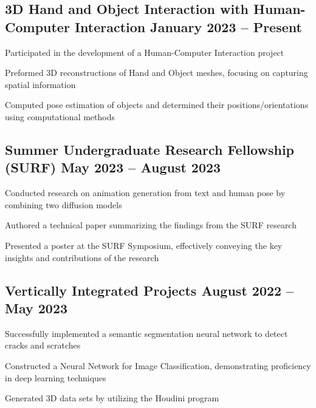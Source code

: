 \documentclass[letter,10pt]{article}
\begin{document}
\subsection{{3D Hand and Object Interaction with Human-Computer Interaction \hfill January 2023 – Present}}
\begin{zitemize}
\item Participated in the development of a Human-Computer Interaction project
\item Preformed 3D reconstructions of Hand and Object meshes, focusing on capturing spatial information
\item Computed pose estimation of objects and determined their positions/orientations using computational methods


\end{zitemize}

\subsection{{Summer Undergraduate Research Fellowship (SURF) \hfill May 2023 – August 2023}}
\begin{zitemize}
\item Conducted research on animation generation from text and human pose by combining two diffusion models
\item Authored a technical paper summarizing the findings from the SURF research
\item Presented a poster at the SURF Symposium, effectively conveying the key insights and contributions of the research
\end{zitemize}


\subsection{{Vertically Integrated Projects \hfill August 2022 – May 2023}}
\begin{zitemize}
\item Successfully implemented a semantic segmentation neural network to detect cracks and scratches
\item Constructed a Neural Network for Image Classification, demonstrating proficiency in deep learning techniques
\item Generated 3D data sets by utilizing the Houdini program

\end{zitemize}
\end{document}
